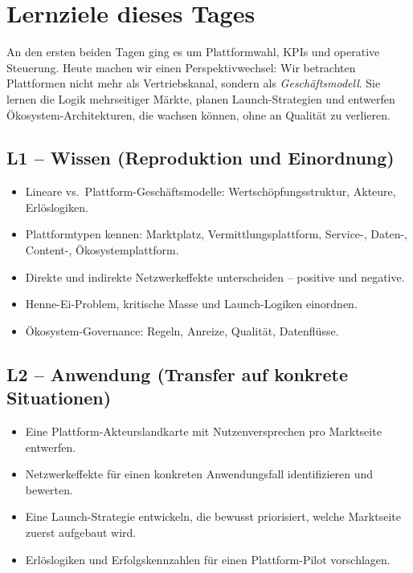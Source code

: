 \documentclass[11pt,a4paper,oneside]{article}
\begin{document}
\section*{Lernziele dieses Tages}
\thispagestyle{plain}

\noindent An den ersten beiden Tagen ging es um Plattformwahl, KPIs und operative Steuerung. Heute machen wir einen Perspektivwechsel: Wir betrachten Plattformen nicht mehr als Vertriebskanal, sondern als \emph{Geschäftsmodell}. Sie lernen die Logik mehrseitiger Märkte, planen Launch-Strategien und entwerfen Ökosystem-Architekturen, die wachsen können, ohne an Qualität zu verlieren.

\subsection*{L1 -- Wissen (Reproduktion und Einordnung)}
\begin{itemize}
  \item Lineare vs.\ Plattform-Geschäftsmodelle: Wertschöpfungsstruktur, Akteure, Erlöslogiken.
  \item Plattformtypen kennen: Marktplatz, Vermittlungsplattform, Service-, Daten-, Content-, Ökosystemplattform.
  \item Direkte und indirekte Netzwerkeffekte unterscheiden -- positive und negative.
  \item Henne-Ei-Problem, kritische Masse und Launch-Logiken einordnen.
  \item Ökosystem-Governance: Regeln, Anreize, Qualität, Datenflüsse.
\end{itemize}

\subsection*{L2 -- Anwendung (Transfer auf konkrete Situationen)}
\begin{itemize}
  \item Eine Plattform-Akteurslandkarte mit Nutzenversprechen pro Marktseite entwerfen.
  \item Netzwerkeffekte für einen konkreten Anwendungsfall identifizieren und bewerten.
  \item Eine Launch-Strategie entwickeln, die bewusst priorisiert, welche Marktseite zuerst aufgebaut wird.
  \item Erlöslogiken und Erfolgskennzahlen für einen Plattform-Pilot vorschlagen.
\end{itemize}
\end{document}
